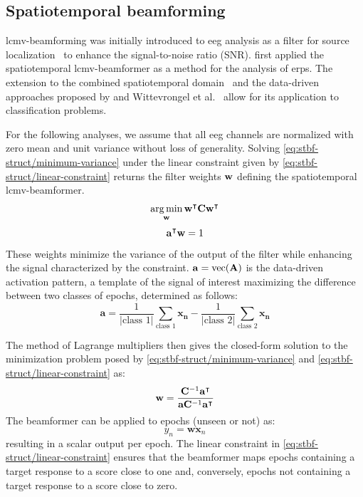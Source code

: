 	\subsection{Spatiotemporal beamforming}
  \ac{lcmv}-beamforming was initially introduced to \ac{eeg} analysis as a filter for
	source localization~\cite{VanVeen1997} to enhance the signal-to-noise ratio
	(SNR).
	\textcite{VanVliet2015} first applied the spatiotemporal
	\ac{lcmv}-beamformer as a method for the analysis of \acp{erp}.
	The extension to the combined spatiotemporal domain~\cite{VanVliet2015} and the
	data-driven approaches proposed by \textcite{Treder2016} and
	Wittevrongel et al.~\cite{Wittevrongel2016} allow for its application to classification problems.

	For the following analyses, we assume that all \ac{eeg} channels are normalized with zero mean and unit variance without loss of generality.
	Solving \cref{eq:stbf-struct/minimum-variance} under the linear constraint given by
  \cref{eq:stbf-struct/linear-constraint} returns the filter weights $\mathbf{w}$ defining the spatiotemporal \ac{lcmv}-beamformer.
	\begin{equation}
    \operatorname*{arg\,min}_{\mathbf{w}}\mathbf{w}^\intercal \mathbf{C}
		\mathbf{w}^\intercal
		\label{eq:stbf-struct/minimum-variance}
	\end{equation}
	\begin{equation}
		\mathbf{a}^\intercal\mathbf{w} = 1
		\label{eq:stbf-struct/linear-constraint}
	\end{equation}
	These weights minimize the variance of the output of the filter while enhancing
	the signal characterized by the constraint.
  $\mathbf{a} = \text{vec}(\mathbf{A})$ is the data-driven activation pattern, a template
	of the signal of interest maximizing the difference between two classes of
	epochs, determined as follows:
	\begin{equation}
		\mathbf{a} =
		\frac{1}{|\text{class 1}|}\sum_\text{class 1}\mathbf{x_n} -
		\frac{1}{|\text{class 2}|}\sum_\text{class 2}\mathbf{x_n}
		\label{eq:stbf-struct/ap}
	\end{equation}

	The method of Lagrange multipliers then gives the closed-form solution to the minimization problem posed by
	\cref{eq:stbf-struct/minimum-variance} and \cref{eq:stbf-struct/linear-constraint} as:
	\begin{equation}
		\mathbf{w} =
    \frac{\mathbf{C}^{-1}\mathbf{a}^\intercal}
    {\mathbf{a}\mathbf{C}^{-1}\mathbf{a}^\intercal}
		\label{eq:stbf-struct/closed-form}
	\end{equation}
	The beamformer can be applied to epochs (unseen or not) as:
	\begin{equation}
		y_n = \mathbf{w}\mathbf{x}_n
		\label{eq:stbf-struct/apply-bf}
	\end{equation}
	resulting in a scalar output per epoch.
	The linear constraint in \cref{eq:stbf-struct/linear-constraint} ensures that the
	beamformer maps epochs containing a target response to a score close to one
	and, conversely, epochs not containing a target response to a score close to
	zero.

